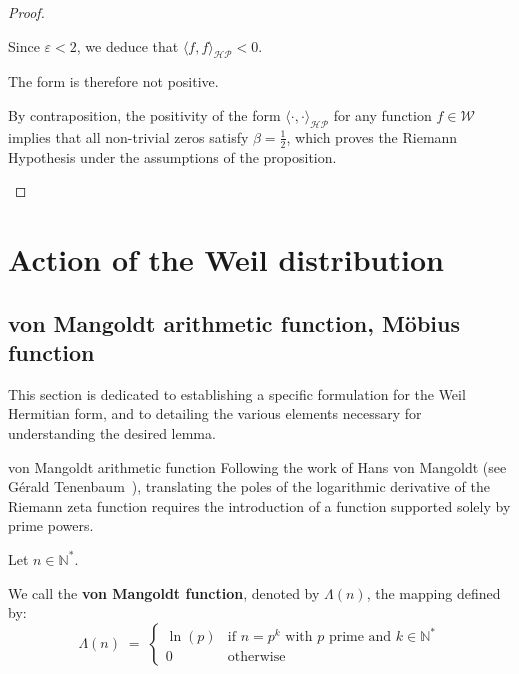 \documentclass[Riemann_Hypothesis.tex]{subfiles}
\begin{document}
\begin{proof}
\begin{part_proof}
\begin{equation*}
        \end{equation*}
        Since $\varepsilon < 2$, we deduce that $\langle f, f \rangle_{\mathcal{HP}} < 0$. \par
        The form is therefore not positive. \par
        By contraposition, the positivity of the form $\langle \cdot, \cdot \rangle_{\mathcal{HP}}$ for any function $f \in \mathcal{W}$ implies that all non-trivial zeros satisfy $\beta = \frac{1}{2}$, which proves the Riemann Hypothesis under the assumptions of the proposition.
    \end{part_proof}
\end{proof}


\color{red}
\section{Action of the Weil distribution}
\color{black}

\color{red}
\subsection{von Mangoldt arithmetic function, Möbius function}
\color{black}

This section is dedicated to establishing a specific formulation for 
the Weil Hermitian form, and to detailing the various elements necessary 
for understanding the desired lemma.


\begin{DefNefEn}[label=df:VonMangoldt]{von Mangoldt arithmetic function}
    Following the work of Hans von Mangoldt 
    (see Gérald Tenenbaum~\cite{tenenbaum2015_intro_en}), translating the poles of the logarithmic derivative of the Riemann zeta function requires the introduction of a function supported solely by prime powers. \par
    Let $n \in \mathbb{N}^*$. \par
    We call the \textbf{von Mangoldt function}, denoted by $\Lambda(n)$, the mapping defined by:
    \begin{equation*}
        \Lambda(n) \;=\; 
        \begin{cases}
            \ln(p) & \text{if } n = p^k \text{ with } p \text{ prime and } k \in \mathbb{N}^* \\
            0 & \text{otherwise}
        \end{cases}
    \end{equation*}
\end{DefNefEn}
\end{document}
